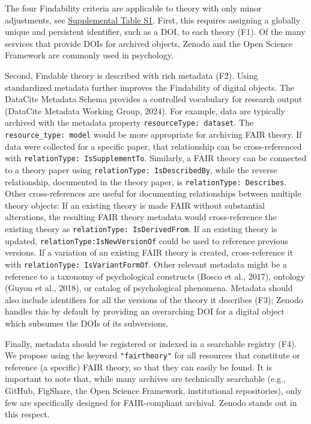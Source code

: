 \documentclass[man]{apa7}
\begin{document}
The four Findability criteria are applicable to theory with only minor adjustments, see \href{https://github.com/cjvanlissa/fair_theory/blob/main/fair_principles.csv}{Supplemental Table S1}.
First, this requires assigning a globally unique and persistent identifier, such as a DOI, to each theory (F1).
Of the many services that provide DOIs for archived objects,
Zenodo and the Open Science Framework are commonly used in psychology.

Second, Findable theory is described with rich metadata (F2).
Using standardized metadata further improves the Findability of digital objects.
The DataCite Metadata Schema provides a controlled vocabulary for research output (DataCite Metadata Working Group, 2024).
For example, data are typically archived with the metadata property \texttt{resourceType:\ dataset}.
The \texttt{resource\_type:\ model} would be more appropriate for archiving FAIR theory.
If data were collected for a specific paper, that relationship can be cross-referenced with \texttt{relationType:\ IsSupplementTo}.
Similarly, a FAIR theory can be connected to a theory paper using \texttt{relationType:\ IsDescribedBy},
while the reverse relationship, documented in the theory paper, is \texttt{relationType:\ Describes}.
Other cross-references are useful for documenting relationships between multiple theory objects: If an existing theory is made FAIR without substantial alterations,
the resulting FAIR theory metadata would cross-reference the existing theory as \texttt{relationType:\ IsDerivedFrom}.
If an existing theory is updated, \texttt{relationType:IsNewVersionOf} could be used to reference previous versions.
If a variation of an existing FAIR theory is created, cross-reference it with \texttt{relationType:\ IsVariantFormOf}.
Other relevant metadata might be a reference to a taxonomy of psychological constructs (Bosco et al., 2017),
ontology (Guyon et al., 2018),
or catalog of psychological phenomena.
Metadata should also include identifiers for all the versions of the theory it describes (F3);
Zenodo handles this by default by providing an overarching DOI for a digital object which subsumes the DOIs of its subversions.

Finally, metadata should be registered or indexed in a searchable registry (F4).
We propose using the keyword \texttt{"fairtheory"} for all resources that constitute or reference (a specific) FAIR theory,
so that they can easily be found.
It is important to note that, while many archives are technically searchable (e.g., GitHub, FigShare, the Open Science Framework, institutional repositories),
only few are specifically designed for FAIR-compliant archival.
Zenodo stands out in this respect.
\end{document}
